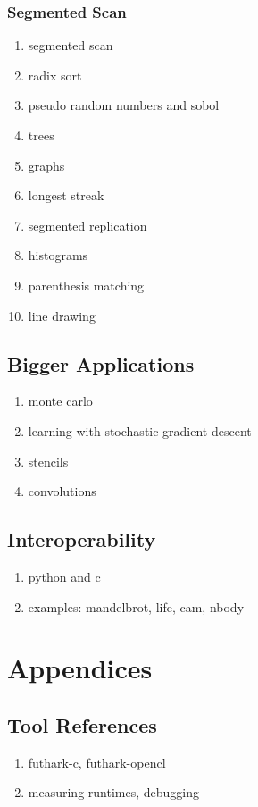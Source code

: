 \documentclass[oneside,11pt]{book}
\begin{document}
\section{Segmented Scan}



\begin{enumerate}
\item segmented scan
\item radix sort

\item pseudo random numbers and sobol
\item trees
\item graphs
\item longest streak
\item segmented replication
\item histograms
\item parenthesis matching
\item line drawing
\end{enumerate}

\chapter{Bigger Applications}
\begin{enumerate}
\item monte carlo
\item learning with stochastic gradient descent
\item stencils
\item convolutions
\end{enumerate}

\chapter{Interoperability}
\label{chap:interoperability}

\begin{enumerate}
\item python and c
\item examples: mandelbrot, life, cam, nbody
\end{enumerate}




\appendix

\part{Appendices}

\chapter{Tool References}
\begin{enumerate}
\item futhark-c, futhark-opencl
\item measuring runtimes, debugging
\end{enumerate}
\end{document}
